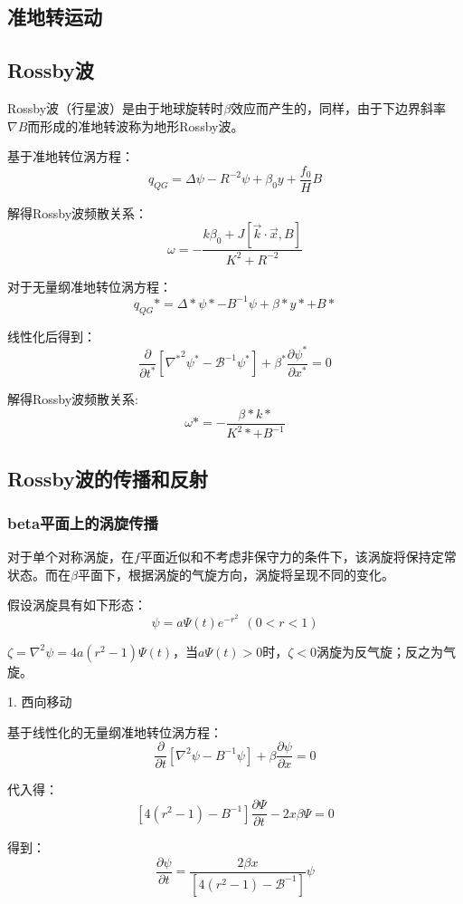 \documentclass{article}
\begin{document}
\subsection{准地转运动}
\subsection{Rossby波}
Rossby波（行星波）是由于地球旋转时$\beta$效应而产生的，同样，由于下边界斜率$\nabla B$而形成的准地转波称为地形Rossby波。

基于准地转位涡方程：
$$q_{QG} = \Delta \psi-R^{-2}\psi+\beta_0y+\frac{f_0}{H}B$$

解得Rossby波频散关系：
$$\omega = -\frac{k\beta_0+J[\vec{k}\cdot\vec{x}, B]}{K^2+R^{-2}}$$

对于无量纲准地转位涡方程：
$$q_{QG}* = \Delta*\psi*-B^{-1}\psi+\beta*y*+B*$$

线性化后得到：
$$\frac{\partial }{\partial {{t}^{*}}}\left[ {{\nabla }^{*}}^{2}{{\psi }^{*}}-{{\mathcal{B}}^{-1}}{{\psi }^{*}} \right]+{{\beta }^{*}}\frac{\partial {{\psi }^{*}}}{\partial {{x}^{*}}}=0$$

解得Rossby波频散关系:
$$\omega*=-\frac{\beta*k*}{K^2*+B^{-1}}$$

\subsection{Rossby波的传播和反射}

\subsubsection{beta平面上的涡旋传播}
对于单个对称涡旋，在$f$平面近似和不考虑非保守力的条件下，该涡旋将保持定常状态。而在$\beta$平面下，根据涡旋的气旋方向，涡旋将呈现不同的变化。

假设涡旋具有如下形态：
$$\psi = a\Psi(t)e^{-r^2} \ \ (0<r<1)$$

$\zeta={{\nabla }}^{2}{{\psi }} = 4a(r^2-1)\Psi(t)$，当$a\Psi(t)>0$时，$\zeta<0$涡旋为反气旋；反之为气旋。

1. 西向移动

基于线性化的无量纲准地转位涡方程：
$$\frac{\partial }{\partial {{t}}}\left[ {{\nabla }}^{2}{{\psi }}-{{B}^{-1}}{{\psi }} \right]+{{\beta }}\frac{\partial {{\psi }}}{\partial {{x}}}=0$$

代入得：
$$\left[ 4({{r}^{2}}-1)-{{B}^{-1}} \right]\frac{\partial \Psi }{\partial t}-2x\beta \Psi =0$$

得到：
$$\frac{\partial \psi }{\partial t}=\frac{2\beta x}{\left[ 4({{r}^{2}}-1)-{{\mathcal{B}}^{-1}} \right]}\psi$$
\end{document}
